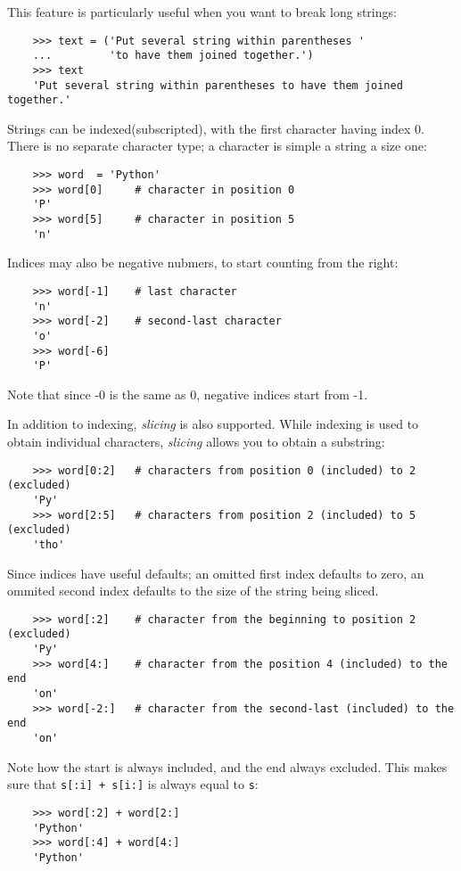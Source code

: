 \documentclass[UTF8]{article}
\begin{document}
This feature is particularly useful when you want to break long strings:
\begin{verbatim}
    >>> text = ('Put several string within parentheses '
    ...         'to have them joined together.')
    >>> text
    'Put several string within parentheses to have them joined together.'
\end{verbatim}

Strings can be indexed(subscripted), with the first character having index 0. There is no separate
character type; a character is simple a string a size one:
\begin{verbatim}
    >>> word  = 'Python'
    >>> word[0]     # character in position 0
    'P'
    >>> word[5]     # character in position 5
    'n'
\end{verbatim}

Indices may also be negative nubmers, to start counting from the right:
\begin{verbatim}
    >>> word[-1]    # last character
    'n'
    >>> word[-2]    # second-last character
    'o'
    >>> word[-6]
    'P'
\end{verbatim}
Note that since -0 is the same as 0, negative indices start from -1.

In addition to indexing, \emph{slicing} is also supported. While indexing is used to obtain
individual characters, \emph{slicing} allows you to obtain a substring:
\begin{verbatim}
    >>> word[0:2]   # characters from position 0 (included) to 2 (excluded)
    'Py'
    >>> word[2:5]   # characters from position 2 (included) to 5 (excluded)
    'tho'
\end{verbatim}

Since indices have useful defaults; an omitted first index defaults to zero, an ommited second
index defaults to the size of the string being sliced.
\begin{verbatim}
    >>> word[:2]    # character from the beginning to position 2 (excluded)
    'Py'
    >>> word[4:]    # character from the position 4 (included) to the end
    'on'
    >>> word[-2:]   # character from the second-last (included) to the end
    'on'
\end{verbatim}

Note how the start is always included, and the end always excluded. This makes sure that
\texttt{s[:i] + s[i:]} is always equal to \texttt{s}:
\begin{verbatim}
    >>> word[:2] + word[2:]
    'Python'
    >>> word[:4] + word[4:]
    'Python'
\end{verbatim}
\end{document}

